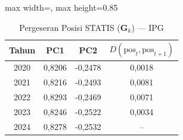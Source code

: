 \begin{table}[H]
\centering
\caption{Pergeseran Posisi STATIS ($\mathbf{G}_k$) --- IPG} \label{tab:app1jarak_statis_loading_ipg}
\begin{adjustbox}{max width=\textwidth, max height=0.85\textheight}
\begin{tabular}{|c|c|c|c|}
\hline
\textbf{Tahun} & \textbf{PC1} & \textbf{PC2} & \textbf{$D(\text{pos}_t, \text{pos}_{t+1})$} \\
\hline
2020 & 0,8206 & -0,2478 & 0,0018 \\
2021 & 0,8216 & -0,2493 & 0,0081 \\
2022 & 0,8293 & -0,2469 & 0,0071 \\
2023 & 0,8246 & -0,2522 & 0,0034 \\
2024 & 0,8278 & -0,2532 & -- \\
\hline
\end{tabular}
\end{adjustbox}
\end{table}